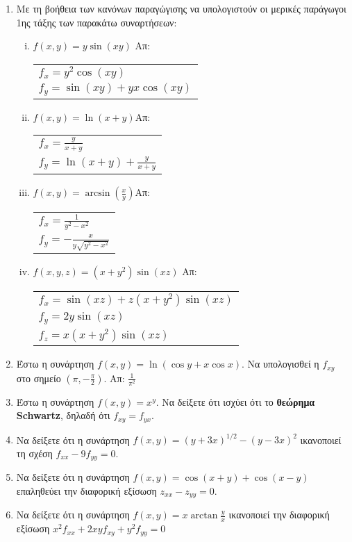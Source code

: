 \begin{enumerate}
  \item Με τη βοήθεια των κανόνων παραγώγισης να υπολογιστούν οι μερικές 
    παράγωγοι 1ης τάξης των παρακάτω συναρτήσεων:

    \begin{enumerate}[i)]
      \item $f(x,y)=y\sin (xy)$ \hfill Απ: \begin{tabular}{l}
          $f_x=y^2\cos(xy)$ \\ 
          $f_y=\sin(xy)+yx\cos(xy)$
        \end{tabular}

      \item $f(x,y)=\ln(x+y)$\hfill Απ: \begin{tabular}{l}
          $f_x=\frac{y}{x+y}$ \\ 
          $f_y=\ln(x+y)+\frac{y}{x+y}$
        \end{tabular}

      \item $f(x,y)=\arcsin(\frac{x}{y})$\hfill Απ: \begin{tabular}{l}
          $f_x=\frac{1}{y^2-x^2}$ \\ 
          $f_y=-\frac{x}{y\sqrt{y^2-x^2}}$
        \end{tabular}
      \item $ f(x,y,z) = (x+y^{2}) \sin{(xz)} $ \hfill Απ: \begin{tabular}{l}
          $ f_{x} = \sin{(xz)} + z(x+y^{2}) \sin{(xz)} $ \\
          $ f_{y} = 2y \sin{(xz)} $ \\
          $ f_{z} = x(x+y^{2}) \sin{(xz)} $
        \end{tabular} 
    \end{enumerate}

  \item Έστω η συνάρτηση $f(x,y)=\ln\left(\cos y+x\cos x\right)$.  Να υπολογισθεί 
    η $ f_{xy} $ στο σημείο $\left(\pi,-\frac{\pi}{2}\right)$.
    \hfill Απ: $\frac{1}{\pi^2}$

  \item Έστω η συνάρτηση $ f(x,y) = x^{y} $. Να δείξετε ότι ισχύει ότι το
    \textbf{θεώρημα Schwartz}, δηλαδή ότι $ f_{xy} = f_{yx} $.
  \item Να δείξετε ότι η συνάρτηση $ f(x,y) = (y+3x)^{1/2} - 
    (y-3x)^{2} $ ικανοποιεί τη σχέση $ f_{xx} - 9 f_{yy} = 0 $.
  \item Να δείξετε ότι η συνάρτηση $ f(x,y) = \cos{(x+y)} + \cos{(x-y)} $ 
    επαληθεύει την διαφορική εξίσωση $ z_{xx} - z_{yy} = 0 $.

  \item Να δείξετε ότι η συνάρτηση $ f(x,y) = x \arctan{\frac{y}{x}} $ 
    ικανοποιεί την διαφορική εξίσωση $ x^{2} f_{xx} + 2xyf_{xy} + y^{2} f_{yy} = 0 $ 
\end{enumerate}

